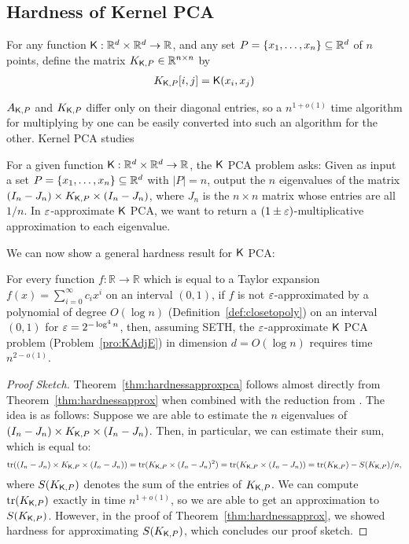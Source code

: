 \subsection{Hardness of Kernel PCA} \label{subsec:kernelPCA}

For any function $\mathsf{K} : {\mathbb R}^d \times {\mathbb R}^d \to {\mathbb R}$, and any set $P = \{x_1, \ldots, x_n\} \subseteq {\mathbb R}^d$ of $n$ points, define the matrix $K_{\mathsf{K},P} \in {\mathbb R}^{n \times n}$ by 
\begin{align*}
K_{\mathsf{K},P}[i,j] = \mathsf{K}(x_i, x_j)
\end{align*}


$A_{\mathsf{K},P}$ and $K_{\mathsf{K},P}$ differ only on their diagonal entries, so a $n^{1 + o(1)}$ time algorithm for multiplying by one can be easily converted into such an algorithm for the other. Kernel PCA studies 

\begin{problem}[$\k$ PCA]\label{pro:KPCA}
For a given function $\mathsf{K} : {\mathbb R}^d \times {\mathbb R}^d \to {\mathbb R}$, the $\k$ PCA problem asks: Given as input a set $P =\{x_1, \ldots, x_n\} \subseteq {\mathbb R}^d$ with $|P|=n$, output the $n$ eigenvalues of the matrix $(I_n-J_n) \times K_{\mathsf{K},P} \times (I_n - J_n)$, where $J_n$ is the $n \times n$ matrix whose entries are all $1/n$. In $\varepsilon$-approximate $\k$ PCA, we want to return a $(1 \pm \varepsilon)$-multiplicative approximation to each eigenvalue.
\end{problem}

We can now show a general hardness result for $\k$ PCA:

\begin{theorem}[Approximate] \label{thm:hardnessapproxpca}
For every function $f:\mathbb{R}\rightarrow \mathbb{R}$ which is equal to a Taylor expansion $f(x) = \sum_{i=0}^{\infty} c_i x^i$ on an interval $(0,1)$, if $f$ is not $\varepsilon$-approximated by a polynomial of degree $O(\log n)$ (Definition~\ref{def:closetopoly}) on an interval $(0,1)$ for $\varepsilon = 2^{-\log^4 n}$, then, assuming {\sf SETH}, the $\varepsilon$-approximate $\k$ PCA problem (Problem~\ref{pro:KAdjE}) in dimension $d = O(\log n)$ requires time $n^{2-o(1)}$.
\end{theorem}

\begin{proof}[Proof Sketch]
Theorem~\ref{thm:hardnessapproxpca} follows almost directly from Theorem~\ref{thm:hardnessapprox} when combined with the reduction from \cite[{Section~5}]{bcis18}. The idea is as follows: Suppose we are able to estimate the $n$ eigenvalues of $(I_n-J_n) \times K_{\mathsf{K},P} \times (I_n - J_n)$. Then, in particular, we can estimate their sum, which is equal to:
$$\mathrm{tr}((I_n-J_n) \times K_{\mathsf{K},P} \times (I_n - J_n)) = \mathrm{tr}(K_{\mathsf{K},P} \times (I_n - J_n)^2)  = \mathrm{tr}(K_{\mathsf{K},P} \times (I_n - J_n)) = \mathrm{tr}(K_{\mathsf{K},P}) - S(K_{\mathsf{K},P})/n,$$
where $S(K_{\mathsf{K},P})$ denotes the sum of the entries of $K_{\mathsf{K},P}$. We can compute $\mathrm{tr}(K_{\mathsf{K},P})$ exactly in time $n^{1+o(1)}$, so we are able to get an approximation to $S(K_{\mathsf{K},P})$. However, in the proof of Theorem~\ref{thm:hardnessapprox}, we showed hardness for approximating $S(K_{\mathsf{K},P})$, which concludes our proof sketch.
\end{proof}
